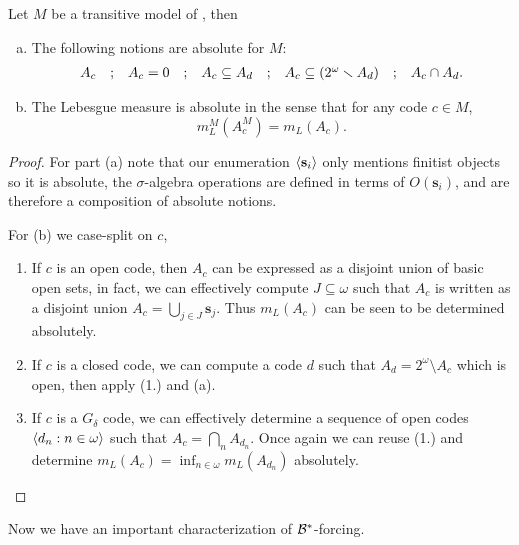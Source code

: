 \begin{proposition} Let \(M\) be a transitive model of \ZF, then
    \begin{enumerate}[(a)]
        \item The following notions are absolute for \(M\):
            \[ \begin{matrix}
                A_c &;& A_c = 0 &;& A_c\subseteq A_d &;& A_c\subseteq\left(2^\omega\smallsetminus A_d\right) &;& A_c\cap A_d.
            \end{matrix} \]
        \item The Lebesgue measure is absolute in the sense that for any code \(c\in M\),
            \[ m_L^M(A_c^M) = m_L(A_c).\]
    \end{enumerate}
\end{proposition}
\begin{proof}
    For part (a) note that our enumeration \(\left\langle\mathbf{s}_i\right\rangle\) only mentions finitist objects so it is absolute,
    the \(\sigma\)-algebra operations are defined in terms of \(O(\mathbf{s}_i)\), and are therefore a composition of absolute notions.

    For (b) we case-split on \(c\),
    \begin{enumerate}
        \item If \(c\) is an open code, then \(A_c\) can be expressed as a disjoint union of basic open sets,
            in fact, we can effectively compute \(J\subseteq \omega\)
            such that \(A_c\) is written as a disjoint union \(A_c = \bigcup_{j\in J} \mathbf{s}_j\).
            Thus \(m_L(A_c)\) can be seen to be determined absolutely.
        \item If \(c\) is a closed code,
            we can compute a code \(d\) such that \(A_d = 2^\omega\setminus A_c\) which is open,
            then apply (1.) and (a).
        \item If \(c\) is a \(G_\delta\) code,
            we can effectively determine a sequence of open codes \(\left\langle d_n:n\in\omega\right\rangle\)
            such that \(A_c = \bigcap_n A_{d_n}\).
            Once again we can reuse (1.) and determine \(m_L(A_c) = \inf_{n\in\omega} m_L(A_{d_n})\) absolutely.
            \hfill\qedhere
    \end{enumerate}
\end{proof}

Now we have an important characterization of \({\mathcal{B}}^*\)-forcing.


